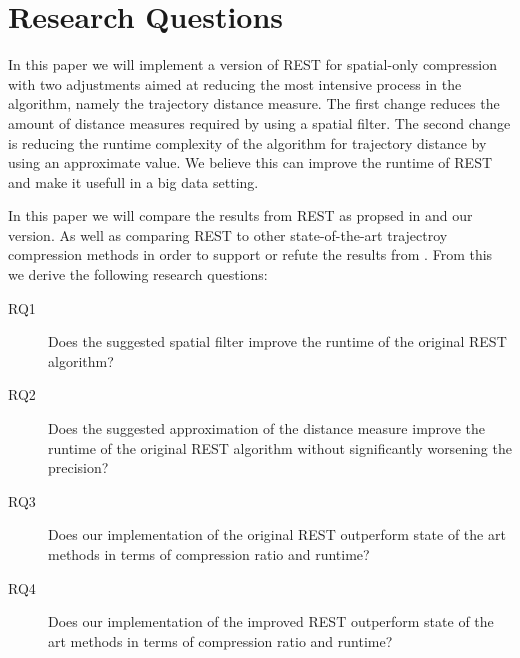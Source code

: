 \section{Research Questions}
In this paper we will implement a version of REST for spatial-only compression with two adjustments aimed at reducing the most intensive process in the algorithm, namely the trajectory distance measure. The first change reduces the amount of distance measures required by using a spatial filter. The second change is reducing the runtime complexity of the algorithm for trajectory distance by using an approximate value. We believe this can improve the runtime of REST and make it usefull in a big data setting.

In this paper we will compare the results from REST as propsed in \cite{zhao2018rest} and our version. As well as comparing REST to other state-of-the-art trajectroy compression methods in order to support or refute the results from \cite{zhao2018rest}. From this we derive the following research questions:

\begin{description}
    \item[RQ1] Does the suggested spatial filter improve the runtime of the original REST algorithm?
    \item[RQ2] Does the suggested approximation of the distance measure improve the runtime of the original REST algorithm without significantly worsening the precision?
    \item[RQ3] Does our implementation of the original REST outperform state of the art methods in terms of compression ratio and runtime?
    \item[RQ4] Does our implementation of the improved REST outperform state of the art methods in terms of compression ratio and runtime?
\end{description}